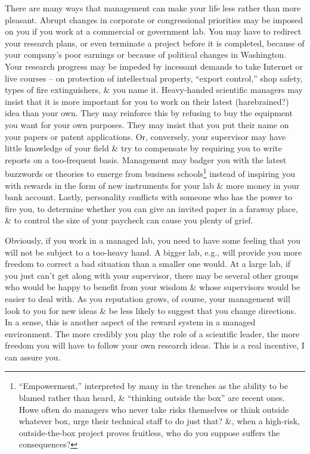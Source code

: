 \documentclass{article}
\begin{document}
\begin{enumerate}
\begin{itemize}
\begin{itemize}
			There are many ways that management can make your life less rather than more pleasant. Abrupt changes in corporate or congressional priorities may be imposed on you if you work at a commercial or government lab. You may have to redirect your research plans, or even terminate a project before it is completed, because of your company's poor earnings or because of political changes in Washington. Your research progress may be impeded by incessant demands to take Internet or live courses -- on protection of intellectual property, ``export control,'' shop safety, types of fire extinguishers, \& you name it. Heavy-handed scientific managers may insist that it is more important for you to work on their latest (harebrained?) idea than your own. They may reinforce this by refusing to buy the equipment you want for your own purposes. They may insist that you put their name on your papers or patent applications. Or, conversely, your supervisor may have little knowledge of your field \& try to compensate by requiring you to write reports on a too-frequent basis. Management may badger you with the latest buzzwords or theories to emerge from business schools\footnote{``Empowerment,'' interpreted by many in the trenches as the ability to be blamed rather than heard, \& ``thinking outside the box'' are recent ones. Howe often do managers who never take risks themselves or think outside whatever box, urge their technical staff to do just that? \&, when a high-risk, outside-the-box project proves fruitless, who do you suppose suffers the consequences?} instead of inspiring you with rewards in the form of new instruments for your lab \& more money in your bank account. Lastly, personality conflicts with someone who has the power to fire you, to determine whether you can give an invited paper in a faraway place, \& to control the size of your paycheck can cause you plenty of grief.
			
			Obviously, if you work in a managed lab, you need to have some feeling that you will not be subject to a too-heavy hand. A bigger lab, e.g., will provide you more freedom to correct a bad situation than a smaller one would. At a large lab, if you just can't get along with your supervisor, there may be several other groups who would be happy to benefit from your wisdom \& whose supervisors would be easier to deal with. As you reputation grows, of course, your management will look to you for new ideas \& be less likely to suggest that you change directions. In a sense, this is another aspect of the reward system in a managed environment. The more credibly you play the role of a scientific leader, the more freedom you will have to follow your own research ideas. This is a real incentive, I can assure you.
			

\end{itemize}
\end{itemize}
\end{enumerate}
\end{document}
